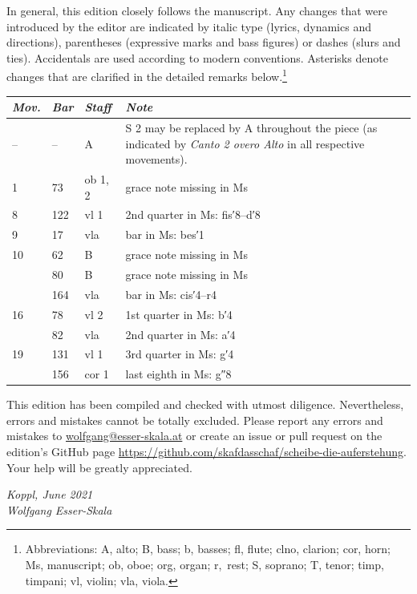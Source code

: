 \documentclass[parskip=full]{scrreprt}
\begin{document}
In general, this edition closely follows the manuscript. Any changes that were introduced by the editor are indicated by italic type (lyrics, dynamics and directions), parentheses (expressive marks and bass figures) or dashes (slurs and ties). Accidentals are used according to modern conventions. Asterisks denote changes that are clarified in the detailed remarks below.\footnote{Abbreviations: A, alto; B, bass; b, basses; fl, flute; clno, clarion; cor, horn; Ms, manuscript; ob, oboe; org, organ; r,~rest; S, soprano; T, tenor; timp, timpani; vl, violin; vla, viola.}

\bigskip

\begin{longtable}{lll L{10cm}}
  \toprule
  \itshape Mov. & \itshape Bar & \itshape Staff & \itshape Note \\
  \midrule \endhead
  – & –  & A       & S 2 may be replaced by A throughout the piece (as indicated by \textit{Canto 2 overo Alto} in all respective movements). \\
  1  & 73  & ob 1, 2 & grace note missing in Ms \\
  8  & 122 & vl 1    & 2nd quarter in Ms: fis′8–d′8 \\
  9  & 17  & vla     & bar in Ms: bes′1 \\
  10 & 62  & B       & grace note missing in Ms \\
     & 80  & B       & grace note missing in Ms \\
     & 164 & vla     & bar in Ms: cis′4–r4 \\
  16 & 78  & vl 2    & 1st quarter in Ms: b′4 \\
     & 82  & vla     & 2nd quarter in Ms: a′4 \\
  19 & 131 & vl 1    & 3rd quarter in Ms: g′4 \\
     & 156 & cor 1   & last eighth in Ms: g″8 \\
  \bottomrule
\end{longtable}


This edition has been compiled and checked with utmost diligence. Nevertheless, errors and mistakes cannot be totally excluded. Please report any errors and mistakes to \url{wolfgang@esser-skala.at} or create an issue or pull request on the edition’s GitHub page \url{https://github.com/skafdasschaf/scheibe-die-auferstehung}. Your help will be greatly appreciated.

\bigskip
\textit{Koppl, June 2021\\
Wolfgang Esser-Skala}
\end{document}
